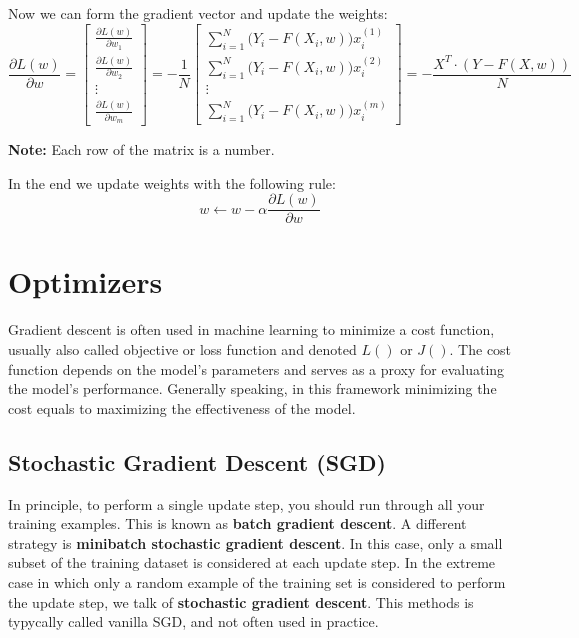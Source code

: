 Now we can form the gradient vector and update the weights:
\begin{equation}
    \frac{\partial L(w)}{\partial w} =
    \begin{bmatrix}
    \frac{\partial L(w)}{\partial w_1} \\
    \frac{\partial L(w)}{\partial w_2} \\
    \vdots \\
    \frac{\partial L(w)}{\partial w_m}
    \end{bmatrix}
    =
    -\frac{1}{N}
    \begin{bmatrix}
    \sum_{i=1}^{N} \big(Y_i - F(X_i, w)\big) x_i^{(1)} \\
    \sum_{i=1}^{N} \big(Y_i - F(X_i, w)\big) x_i^{(2)} \\
    \vdots \\
    \sum_{i=1}^{N} \big(Y_i - F(X_i, w)\big) x_i^{(m)}
    \end{bmatrix}
    =
    -\frac{X^T \cdot (Y - F(X, w))}{N}
    \end{equation}

\textbf{Note:} Each row of the matrix is a number.

In the end we update weights with the following rule:
\begin{equation}
    w \gets w - \alpha \frac{\partial L(w)}{\partial w}
\end{equation}


\section{Optimizers}
Gradient descent is often used in machine learning to minimize a cost function, usually also called objective or loss function and denoted $L()$ or $J()$.
The cost function depends on the model’s parameters and serves as a proxy for evaluating the
model's performance. Generally speaking, in this framework minimizing the cost equals to
maximizing the effectiveness of the model.

\subsection{Stochastic Gradient Descent (SGD)}
In principle, to perform a single update step, you should run through all your training examples. This is known as \textbf{batch gradient descent}.
A different strategy is \textbf{minibatch stochastic gradient descent}. In this case, only a small subset of the training dataset is considered at each update step.
In the extreme case in which only a random example of the training set is considered to perform the update step, we talk of \textbf{stochastic gradient descent}.
This methods is typycally called vanilla SGD, and not often used in practice. 

